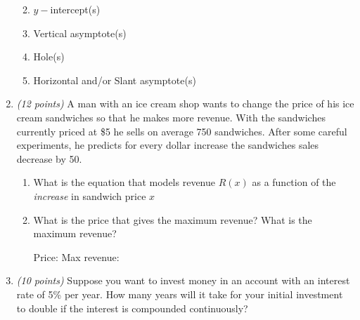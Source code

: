 \documentclass[fleqn]{article}
\renewcommand{\thispagestyle}[1]{}
\begin{document}
\begin{enumerate}
\begin{enumerate}
\vspace{1.25in}

\item $y-$intercept(s)

\vspace{1.25in}

\item Vertical asymptote(s)

\vspace{1.25in}

\item Hole(s)

\vspace{1.25in}

\item Horizontal and/or Slant asymptote(s)

\end{enumerate}

\pagebreak
\thispagestyle{fancy}{
\lhead{}
}

\item 
\textit{(12 points)} A man with an ice cream shop wants to change the price of his ice cream sandwiches so that he makes more revenue.  With the sandwiches currently priced at \$5 he sells on average 750 sandwiches.  After some careful experiments, he predicts for every dollar increase the sandwiches sales decrease by 50.
\begin{enumerate}
\item What is the equation that models revenue $R(x)$ as a function of the \textit{increase} in sandwich price $x$

\vspace{1in}

\item What is the price that gives the maximum revenue?  What is the maximum revenue?

\vspace{2in}
Price:  \underline{\hspace{2in}} \qquad Max revenue: \underline{\hspace{2in}}

\end{enumerate}

\vspace{0.5in}

\item \textit{(10 points)} Suppose you want to invest money in an account with an interest rate of 5\% per year.
How many years will it take for your initial investment to double if the interest is compounded continuously?


\end{enumerate}
\end{document}
